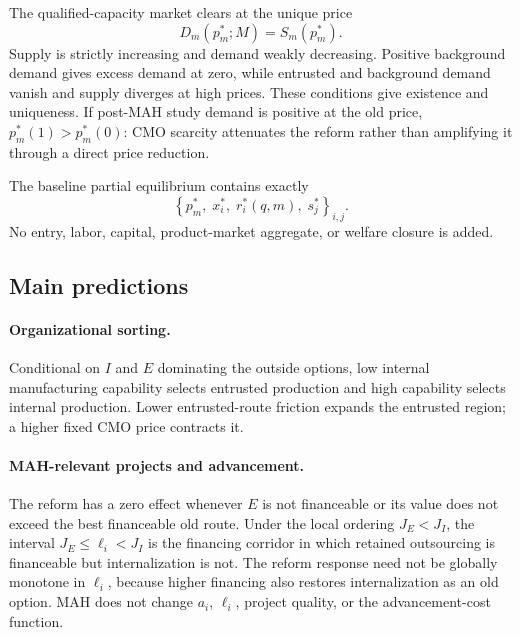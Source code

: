 \documentclass[11pt]{article}
\begin{document}
The qualified-capacity market clears at the unique price
\begin{equation}
  D_m(p_m^*;M)=S_m(p_m^*).
  \label{eq:p16m-clearing}
\end{equation}
Supply is strictly increasing and demand weakly decreasing. Positive
background demand gives excess demand at zero, while entrusted and
background demand vanish and supply diverges at high prices. These conditions
give existence and uniqueness. If post-MAH study demand is positive at the
old price, \(p_m^*(1)>p_m^*(0)\): CMO scarcity attenuates the reform rather
than amplifying it through a direct price reduction.

The baseline partial equilibrium contains exactly
\begin{equation}
  \left\{
  p_m^*,\;
  x_i^*,\;
  r_i^*(q,m),\;
  s_j^*
  \right\}_{i,j}.
  \label{eq:p16m-equilibrium}
\end{equation}
No entry, labor, capital, product-market aggregate, or welfare closure is
added.

\subsection{Main predictions}
\label{subsec:p16m-predictions}

\paragraph{Organizational sorting.}
Conditional on \(I\) and \(E\) dominating the outside options, low internal
manufacturing capability selects entrusted production and high capability
selects internal production. Lower entrusted-route friction expands the
entrusted region; a higher fixed CMO price contracts it.

\paragraph{MAH-relevant projects and advancement.}
The reform has a zero effect whenever \(E\) is not financeable or its value
does not exceed the best financeable old route. Under the local ordering
\(J_E<J_I\), the interval \(J_E\leq\ell_i<J_I\) is the financing corridor in
which retained outsourcing is financeable but internalization is not. The
reform response need not be globally monotone in \(\ell_i\), because higher
financing also restores internalization as an old option. MAH does not change
\(a_i\), \(\ell_i\), project quality, or the advancement-cost function.
\end{document}
